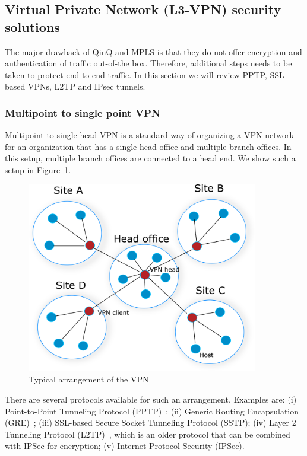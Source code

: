 \subsection{Virtual Private Network (L3-VPN) security solutions}

The major drawback of QinQ and MPLS is that they do not offer encryption and 
authentication of traffic out-of-the box. Therefore, additional steps needs to be taken to protect end-to-end
traffic. In this section we will review PPTP, SSL-based VPNs, L2TP and IPsec tunnels.

\subsubsection{Multipoint to single point VPN}

Multipoint to single-head VPN is a standard way of organizing a VPN network
for an organization that has a single head office and multiple branch offices.
In this setup, multiple branch offices are connected to a head end. 
We show such a setup in Figure~\ref{fig:head-vpn}.

\begin{figure}[ht!]
    \centering
    \includegraphics[width=0.9\textwidth]{graphics/vpn-central.png}
    \caption{Typical arrangement of the VPN}
    \label{fig:head-vpn}
\end{figure}

There are several protocols available for such an arrangement. Examples are:
(i) Point-to-Point Tunneling Protocol (PPTP)~\cite{tcpip}; (ii) Generic Routing Encapsulation (GRE)~\cite{tcpip}; 
(iii) SSL-based Secure Socket Tunneling Protocol (SSTP); (iv) Layer 2 Tunneling Protocol (L2TP)~\cite{tcpip}, 
which is an older protocol that can be combined with IPSec for encryption;
(v) Internet Protocol Security (IPSec).

